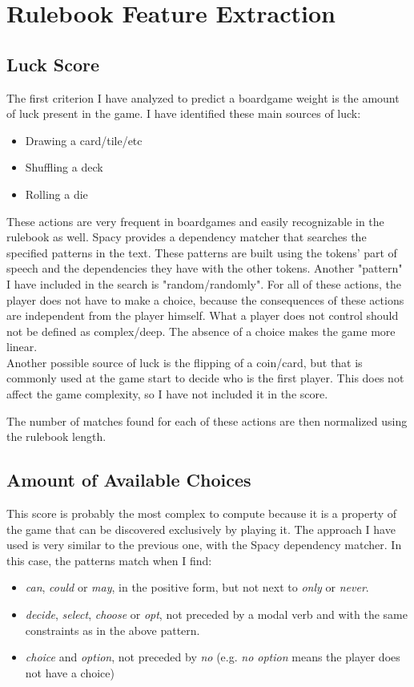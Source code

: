 \documentclass[runningheads]{llncs}
\begin{document}
\section{Rulebook Feature Extraction}

\subsection{Luck Score}
The first criterion I have analyzed to predict a boardgame weight is the amount of luck present in the game. I have identified these main sources of luck:

\begin{itemize}
    \item Drawing a card/tile/etc
    \item Shuffling a deck
    \item Rolling a die
\end{itemize}

\noindent These actions are very frequent in boardgames and easily recognizable in the rulebook as well. Spacy provides a dependency matcher that searches the specified patterns in the text. These patterns are built using the tokens' part of speech and the dependencies they have with the other tokens. Another "pattern" I have included in the search is "random/randomly". For all of these actions, the player does not have to make a choice, because the consequences of these actions are independent from the player himself. What a player does not control should not be defined as complex/deep. The absence of a choice makes the game more linear.
\\
Another possible source of luck is the flipping of a coin/card, but that is commonly used at the game start to decide who is the first player. This does not affect the game complexity, so I have not included it in the score.

The number of matches found for each of these actions are then normalized using the rulebook length. 

\subsection{Amount of Available Choices}
This score is probably the most complex to compute because it is a property of the game that can be discovered exclusively by playing it. The approach I have used is very similar to the previous one, with the Spacy dependency matcher. In this case, the patterns match when I find:

\begin{itemize}
    \item \textit{can}, \textit{could} or \textit{may}, in the positive form, but not next to \textit{only} or \textit{never}. 
    \item \textit{decide}, \textit{select}, \textit{choose} or \textit{opt}, not preceded by a modal verb and with the same constraints as in the above pattern.
    \item \textit{choice} and \textit{option}, not preceded by \textit{no} (e.g. \textit{no option} means the player does not have a choice)
\end{itemize}
\end{document}
